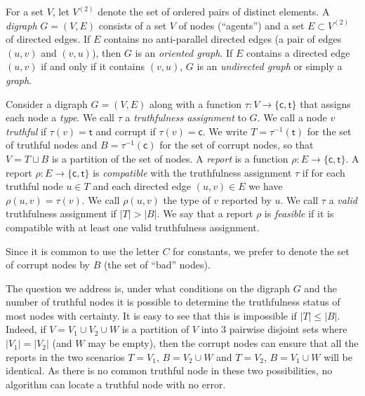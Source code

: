 \documentclass{toc}
\begin{document}
\begin{definition} 
For a set $V$, let $V^{(2)}$ denote the set of ordered pairs of 
distinct elements. 
A \emph{digraph} $G=(V,E)$ consists of a set $V$ of nodes (``agents'') 
and a set $E \subset  V^{(2)}$ of directed edges. If $E$ contains no
anti-parallel directed edges (a pair of edges $(u,v)$ and $(v,u)$), then
$G$ is an \emph{oriented graph}. If $E$ contains a directed edge 
$(u,v)$ if and only if it contains $(v,u)$, $G$ is an 
\emph{undirected graph} or simply a \emph{graph}.
%
\end{definition}
%
%
\begin{definition}
Consider a
%
digraph    %
$G=(V,E)$ along with a function $\tau : V \to \{\mathsf{c},\mathsf{t}\}$ 
that assigns each node a \emph{type}. We call $\tau$ a 
\emph{truthfulness assignment} to $G$. 
We call a node $v$ \emph{truthful} if $\tau(v) = \mathsf{t}$ and corrupt if $\tau(v) = \mathsf{c}$. 
We write $T = \tau^{-1}(\mathsf{t})$ for the set of truthful nodes and $B =  \tau^{-1}(\mathsf{c})$
for the set of corrupt nodes, so that $V = T \sqcup B$ is a partition of the set of nodes. 
A \emph{report} is a function $\rho: E \to \{\mathsf{c},\mathsf{t}\}$. 
A report $\rho: E \to \{\mathsf{c},\mathsf{t}\}$ is \emph{compatible} with 
the truthfulness assignment $\tau$ if for each truthful node $u \in T$ and each
directed edge $(u, v) \in E$ we have $\rho(u,v) = \tau(v)$.  
We call $\rho(u,v)$ the type of $v$ reported by $u$. 
We call $\tau$ a \emph{valid} truthfulness assignment if $|T| > |B|$. 
We say that a report $\rho$ is \emph{feasible} if
it is compatible with at least one valid truthfulness assignment.
%
%
%
\end{definition}
Since it is common to use the letter $C$ for constants, we prefer to denote the set of corrupt nodes by $B$ (the set of  ``bad'' nodes). 

The question we address is, %
under what conditions on the digraph
$G$ and the number of truthful nodes it is possible to determine 
the truthfulness status of
most nodes %
%
with certainty. %
It is easy to see
that this is impossible if $|T| \leq |B|$. Indeed, if $V=V_1 \cup
V_2 \cup W$ is a partition of $V$ into $3$ pairwise disjoint sets
where $|V_1|=|V_2|$ (and $W$ may be empty),
then the corrupt nodes can ensure that all the reports 
in the two scenarios $T=V_1$, $B=V_2 \cup W$ and $T=V_2$, $B=V_1 \cup W$
will be identical. As there is no common truthful node  in these
two possibilities, no algorithm can locate a truthful
node with no error.
\end{document}
